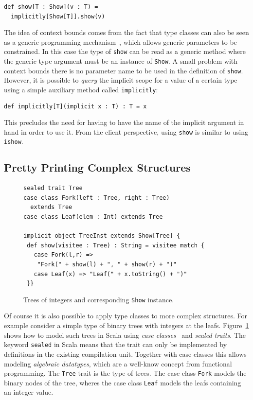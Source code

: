 \documentclass[preprint,nocopyrightspace]{sigplanconf}
\begin{document}
\begin{lstlisting}
def show[T : Show](v : T) =
  implicitly[Show[T]].show(v)
\end{lstlisting}

The idea of context bounds comes from the fact that type classes can
also be seen as a generic programming mechanism~\cite{GP}, which allows
generic parameters to be constrained. In this case the type of
\lstinline{show} can be read as a generic method where the generic
type argument must be an instance of \lstinline{Show}.
A small problem with context bounds there is no parameter name to be used in the
definition of \lstinline{show}. However, it is possible to
\emph{query} the implicit scope for a value of a certain type
using a simple auxiliary method called \lstinline{implicitly}:

\begin{lstlisting}
def implicitly[T](implicit x : T) : T = x
\end{lstlisting}

This precludes the need for having to have the name of the implicit
argument in hand in order to use it.
From the client perspective, using \lstinline{show} is similar to
using \lstinline{ishow}.

\subsection{Pretty Printing Complex Structures}\label{sec:pretty-printing-complex}

\begin{figure}
\begin{lstlisting}
sealed trait Tree
case class Fork(left : Tree, right : Tree)
  extends Tree
case class Leaf(elem : Int) extends Tree

implicit object TreeInst extends Show[Tree] {
 def show(visitee : Tree) : String = visitee match {
   case Fork(l,r) =>
    "Fork(" + show(l) + ", " + show(r) + ")"
   case Leaf(x) => "Leaf(" + x.toString() + ")"
 }}
\end{lstlisting}
\caption{Trees of integers and corresponding \lstinline{Show}
  instance.}
\label{fig:trees}
\end{figure}

Of course it is also possible to apply type classes to more complex
structures. For example consider a simple type of binary trees with
integers at the leafs. Figure~\ref{fig:trees} shows how to model such
trees in Scala using \emph{case classes}~\cite{Match} and \emph{sealed
  traits}. The keyword \lstinline{sealed} in Scala means that the
trait can only be implemented by definitions in the existing
compilation unit.
Together with case classes this allows modeling \emph{algebraic
  datatypes}, which are a well-know concept from functional programming.
The \lstinline{Tree} trait is the type of trees. The case class
\lstinline{Fork} models the binary nodes of the tree, wheres the case
class \lstinline{Leaf} models the leafs containing an integer value.
\end{document}
